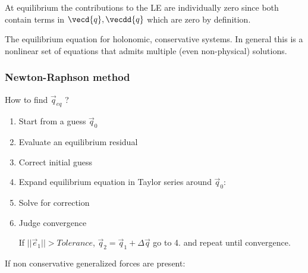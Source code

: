 \documentclass[10pt,a4paper]{scrartcl}
\begin{document}
\begin{multicols*}{2}
At equilibrium the contributions to the LE are individually zero since both contain terms in $\vecd{q},\vecdd{q}$ which are zero by definition.



The equilibrium equation for holonomic, conservative systems. In general this is a nonlinear set of equations that admits multiple (even non-physical) solutions.

\subsubsection{Newton-Raphson method}

How to find $\vec{q}_{eq}$ ?


\begin{enumerate}
\item Start from a guess $\vec{q}_0$
\item Evaluate an equilibrium residual

\item Correct initial guess

\item Expand equilibrium equation in Taylor series around $\vec{q}_0$:

\item Solve for correction


\item Judge convergence


If $||\vec{e}_1||>Tolerance$, $\vec{q}_2=\vec{q}_1+\Delta\vec{q}$ go to 4. and repeat until convergence.
\end{enumerate}

If non conservative generalized forces are present:



\end{multicols*}
\end{document}
